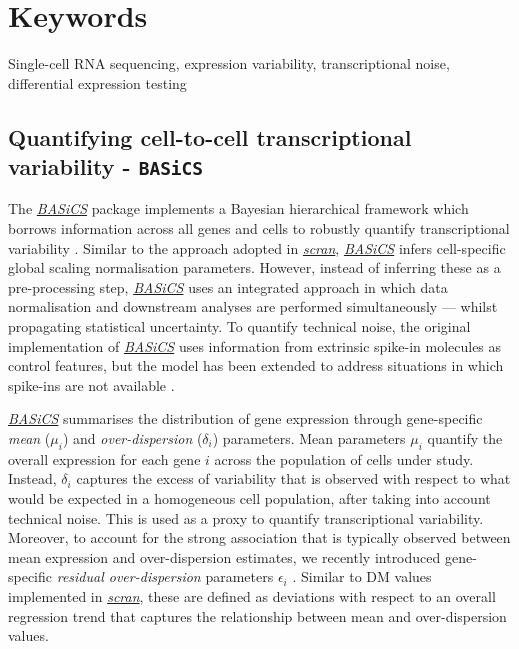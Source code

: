 \documentclass[9pt,a4paper,]{extarticle}
\begin{document}
\section*{Keywords}
Single-cell RNA sequencing, expression variability, transcriptional noise, differential expression testing


\clearpage
\pagestyle{main}

\hypertarget{quantifying-cell-to-cell-transcriptional-variability---basics}{%
\subsection{\texorpdfstring{Quantifying cell-to-cell transcriptional variability - \texttt{BASiCS}}{Quantifying cell-to-cell transcriptional variability - BASiCS}}\label{quantifying-cell-to-cell-transcriptional-variability---basics}}

The \emph{\href{https://bioconductor.org/packages/3.11/BASiCS}{BASiCS}} package implements a Bayesian hierarchical framework
which borrows information across all genes and cells to robustly quantify
transcriptional variability \citep{Vallejos2015BASiCS}.
Similar to the approach adopted in \emph{\href{https://bioconductor.org/packages/3.11/scran}{scran}}, \emph{\href{https://bioconductor.org/packages/3.11/BASiCS}{BASiCS}}
infers cell-specific global scaling normalisation parameters.
However, instead of inferring these as a pre-processing step,
\emph{\href{https://bioconductor.org/packages/3.11/BASiCS}{BASiCS}} uses an integrated approach in which data normalisation
and downstream analyses are performed simultaneously --- whilst propagating
statistical uncertainty.
To quantify technical noise, the original implementation of
\emph{\href{https://bioconductor.org/packages/3.11/BASiCS}{BASiCS}} uses information from extrinsic spike-in molecules as
control features, but the model has been extended to address situations in which
spike-ins are not available \citep{Eling2018}.

\emph{\href{https://bioconductor.org/packages/3.11/BASiCS}{BASiCS}} summarises the distribution of gene expression through
gene-specific \emph{mean} (\(\mu_i\)) and \emph{over-dispersion} (\(\delta_i\)) parameters.
Mean parameters \(\mu_i\) quantify the overall expression for each gene \(i\)
across the population of cells under study.
Instead, \(\delta_i\) captures the excess of variability that is observed with
respect to what would be expected in a homogeneous cell population, after
taking into account technical noise.
This is used as a proxy to quantify transcriptional variability.
Moreover, to account for the strong association that is typically observed
between mean expression and over-dispersion estimates, we recently introduced
gene-specific \emph{residual over-dispersion} parameters \(\epsilon_i\) \citep{Eling2018}.
Similar to DM values implemented in \emph{\href{https://bioconductor.org/packages/3.11/scran}{scran}}, these are defined as
deviations with respect to an overall regression trend that captures the
relationship between mean and over-dispersion values.
\end{document}
